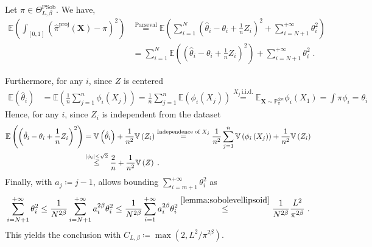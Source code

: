 \documentclass[10pt]{article} %
\newcommand{\Prob}[0]{\mathbb{P}}
\newcommand{\E}[0]{\mathbb{E}}
\newcommand{\V}[0]{\mathbb{V}}
\newcommand\vect[1]{\mathbf{#1}}
\newcommand\p[1]{\left( {#1}\right)}
\begin{document}
Let $\pi \in \Theta^{\text{PSob}}_{L, \beta}$.
    We have, 
    \begin{equation*}
    \begin{aligned}
         \E \p{ \int_{[0, 1]} \p{\hat{\pi}^{\text{proj}}(\vect{X}) - \pi}^2}
         & \stackrel{\text{Parseval}}{=}
          \E \p{ \sum_{i=1}^N \p{\hat{\theta}_i -\theta_i + \frac{1}{n} Z_i}^2 + \sum_{i=N+1}^{+\infty} \theta_i^2 } \\
          & \stackrel{\text{}}{=}
           \sum_{i=1}^N \E \p{\p{\hat{\theta}_i -\theta_i + \frac{1}{n} Z_i}^2} + \sum_{i=N+1}^{+\infty} \theta_i^2 \;.
    \end{aligned}
    \end{equation*}

Furthermore, for any $i$, since $Z$ is centered
\begin{equation*}
    \begin{aligned}
        \E \p{\hat{\theta}_i} 
        &= 
        \E \p{\frac{1}{n} \sum_{j=1}^n \phi_i(X_j)}
        =
        \frac{1}{n} \sum_{j=1}^n \E \p{\phi_i(X_j)} 
        \stackrel{X_j\ \mathrm{i.i.d.}}{=} \E_{\vect{X} \sim \Prob_{\pi}^{\otimes n}} \phi_i(X_1) = \int \pi \phi_i = \theta_i
    \end{aligned}
\end{equation*}
Hence, for any $i$, since $Z_i$ is independent from the dataset
\begin{equation*}
    \begin{aligned}
        \E \p{\p{\hat{\theta}_i -\theta_i + \frac{1}{n} Z_i}^2}
        &= 
        \V \p{\hat{\theta}_i} + \frac{1}{n^2} \V \p{Z_i} 
        \stackrel{\text{Independence of $X_j$}}{=}
        \frac{1}{n^2} \sum_{j=1}^n \V \p{\phi_i \p{X_j}} + \frac{1}{n^2} \V \p{Z_i} \\
        &\stackrel{|\phi_i| \leq \sqrt{2}}{\leq}
        \frac{%
        2}{n}+ \frac{1}{n^2} \V \p{Z} \;.
    \end{aligned}
\end{equation*}
Finally, with $a_j \coloneqq j-1$,  allows bounding $\sum_{i=m+1}^{+\infty} \theta_i^2$ as
\begin{equation*}
    \sum_{i=N+1}^{+\infty} \theta_i^2 \leq \frac{1}{N^{2 \beta}} \sum_{i=N+1}^{+\infty} a_i^{2\beta} \theta_i^2 \leq \frac{1}{N^{2 \beta}} \sum_{i=1}^{+\infty} a_i^{2\beta} \theta_i^2 \stackrel{\Cref{lemma:sobolevellipsoid}}{\leq} \frac{1}{N^{2 \beta}} \frac{L^2}{\pi^{2 \beta}} \;.
\end{equation*}
This yields the conclusion with $C_{L,\beta} \coloneqq \max(2, L^2/\pi^{2\beta})$.
\end{document}
